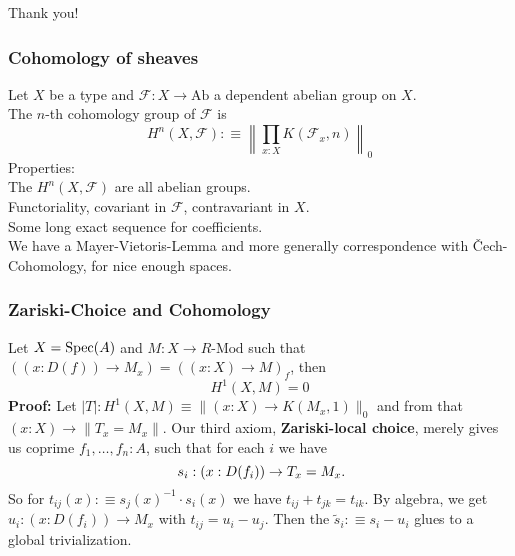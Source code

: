 \documentclass{beamer}
\begin{document}
\begin{frame}
  \centering
  Thank you!
\end{frame}

\begin{frame}
  \frametitle{Cohomology of sheaves}
  Let $X$ be a type and $\mathcal F:X\to \mathrm{Ab}$ a dependent abelian group on $X$. \\
  \pause
  The $n$-th cohomology group of $\mathcal F$ is
  \[ H^n(X,\mathcal F):\equiv\left\|\prod_{x:X}K(\mathcal F_x,n)\right\|_0 \]
  \pause
  Properties: \\
  \pause
  The $H^n(X,\mathcal F)$ are all abelian groups. \\
  \pause
  Functoriality, covariant in $\mathcal F$, contravariant in $X$. \\
  \pause
  Some long exact sequence for coefficients. \\
  \pause
  We have a Mayer-Vietoris-Lemma and more generally correspondence with \v{C}ech-Cohomology, for nice enough spaces. \\
\end{frame}

\begin{frame}
  \frametitle{Zariski-Choice and Cohomology}  
  Let $X=\operatorname{Spec}(A)$ and $M:X\to R\text{-Mod}$ such that $((x:D(f))\to M_x)=((x:X)\to M)_f$, then
  \[ H^1(X,M)=0 \]
  \pause
  \textbf{Proof:} Let $|T|: H^1(X,M)\equiv \|(x:X)\to K(M_x,1)\|_0$ and from that $(x:X)\to \|T_x=M_x\|$.
  \pause
  Our third axiom, \textbf{Zariski-local choice}, merely gives us coprime $f_1,\dots,f_n:A$, such that for each $i$ we have
  \[
    s_i:(x:D(f_i)) \to T_x=M_x
    \rlap{.}
  \]
  \pause
  So for $t_{ij}(x):\equiv s_j(x)^{-1}\cdot s_i(x)$ we have $t_{ij}+t_{jk}=t_{ik}$.
  \pause
  By algebra, we get $u_i:(x:D(f_i))\to M_x$ with $t_{ij}=u_i-u_j$.
  Then the $\tilde{s}_i:\equiv s_i-u_i$ glues to a global trivialization.
\end{frame}
\end{document}

